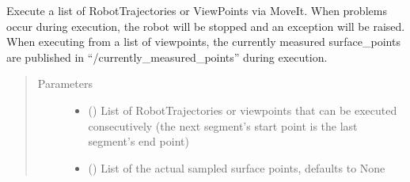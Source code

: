 \documentclass[letterpaper,10pt,english]{sphinxmanual}
\begin{document}
\begin{fulllineitems}
\begin{fulllineitems}
\label{\detokenize{module_trajectory_manager:agiprobot_measurement.trajectory_manager.TrajectoryManager.execute}}
Execute a list of RobotTrajectories or ViewPoints via MoveIt. When problems occur during execution,
the robot will be stopped and an exception will be raised. When executing from a list of viewpoints, the currently measured surface\_points
are published in “/currently\_measured\_points” during execution.
\begin{quote}\begin{description}
\item[{Parameters}] \leavevmode\begin{itemize}
\item {} 
 (\sphinxstyleliteralemphasis{{[}}\sphinxstyleliteralemphasis{{]} or }\sphinxstyleliteralemphasis{{[}}{\hyperref[\detokenize{module_view:agiprobot_measurement.viewpoint.ViewPoint}]{\sphinxcrossref{\sphinxstyleliteralemphasis{ViewPoint}}}}\sphinxstyleliteralemphasis{{]}}) \textendash{} List of RobotTrajectories or viewpoints that can be executed consecutively (the next segment’s start point is the last segment’s end point)

\item {} 
 (\sphinxstyleliteralemphasis{{[}}\sphinxstyleliteralemphasis{{]}}\sphinxstyleliteralemphasis{, }) \textendash{} List of the actual sampled surface points, defaults to None

\end{itemize}

\end{description}\end{quote}

\end{fulllineitems}



\end{fulllineitems}
\end{document}
